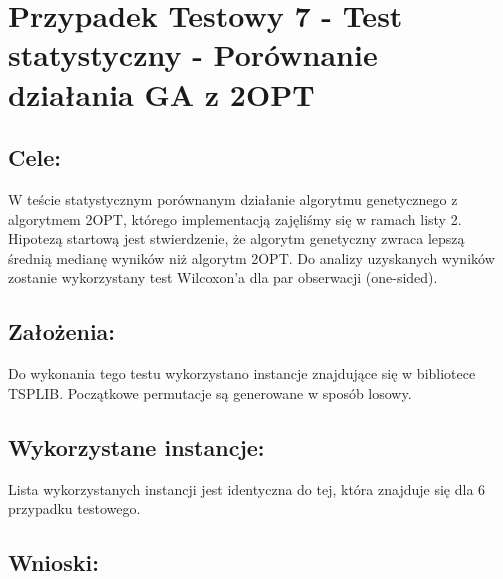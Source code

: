\section{Przypadek Testowy 7 - Test statystyczny - Porównanie działania GA z 2OPT}
  \subsection{Cele:}
  W teście statystycznym porównanym działanie algorytmu genetycznego z algorytmem 2OPT,
  którego implementacją zajęliśmy się w ramach listy 2. Hipotezą startową jest stwierdzenie, że
  algorytm genetyczny zwraca lepszą średnią medianę wyników niż algorytm 2OPT. Do analizy
  uzyskanych wyników zostanie wykorzystany test Wilcoxon'a dla par obserwacji (one-sided).
  \subsection{Założenia: }
  Do wykonania tego testu wykorzystano instancje znajdujące się w bibliotece TSPLIB. Początkowe permutacje są generowane w sposób
  losowy.
  \subsection{Wykorzystane instancje: }
  Lista wykorzystanych instancji jest identyczna do tej, która znajduje się dla 6 przypadku testowego.
    \subsection{Wnioski: }
